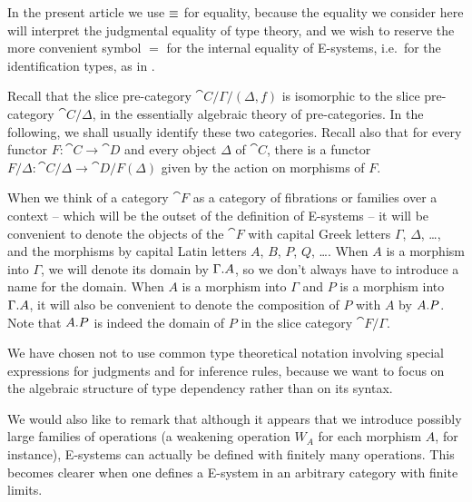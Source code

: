 \begin{rmk}
In the present article we use $\equiv$ for equality, because the equality we
consider here will interpret the judgmental equality of type theory, 
and we wish to reserve
the more convenient symbol $=$ for the internal equality of E-systems, i.e.~for
the identification types, as in \cite{TheBook}. 
\end{rmk}

\begin{rmk}
Recall that the slice pre-category $\cat{C}/\Gamma/(\Delta,f)$ is isomorphic to the slice pre-category
$\cat{C}/\Delta$, in the essentially algebraic theory of pre-categories. In the following,
we shall usually identify these two categories. Recall also that for every functor
$F:\cat{C}\to\cat{D}$ and every object $\Delta$ of $\cat{C}$, there is a functor
$F/\Delta:\cat{C}/\Delta\to \cat{D}/F(\Delta)$ given by the action on morphisms of $F$. 
\end{rmk}

\begin{rmk}
When we think of a category $\cat{F}$ as a category of fibrations or families
over a context -- which will be the outset of the definition of E-systems --
it will be convenient to denote the objects of the $\cat{F}$ with capital
Greek letters $\Gamma$, $\Delta$, \ldots, and the morphisms by capital Latin letters
$A$, $B$, $P$, $Q$, \ldots. When $A$ is a morphism into $\Gamma$, we will denote
its domain by $\ctxext{\Gamma}{A}$, so we don't always have to introduce a name
for the domain. When $A$ is a morphism into $\Gamma$ and
$P$ is a morphism into $\ctxext{\Gamma}{A}$, it will also be convenient to denote the
composition of $P$ with $A$ by $\ctxext{A}{P}$. Note that $\ctxext{A}{P}$
is indeed the domain of $P$ in the slice category $\cat{F}/\Gamma$.
\end{rmk}

\begin{rmk}
We have chosen not to use common type theoretical notation involving special
expressions for judgments and for inference rules, because we want to focus
on the algebraic structure of type dependency rather than on its syntax.

We would also like to remark that although it appears that we introduce possibly
large families of operations (a weakening operation $W_A$ for each morphism $A$,
for instance), E-systems can actually be defined with finitely many
operations. This becomes clearer when one defines a E-system in an arbitrary
category with finite limits.
\end{rmk}

